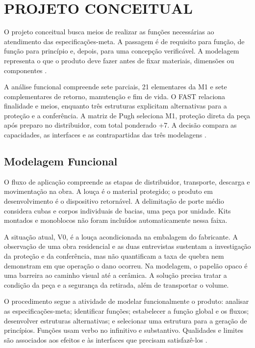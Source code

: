 \clearpage
\section{PROJETO CONCEITUAL}

O projeto conceitual busca meios de realizar as funções necessárias ao atendimento das especificações-meta. A passagem é de requisito para função, de função para princípio e, depois, para uma concepção verificável. A modelagem representa o que o produto deve fazer antes de fixar materiais, dimensões ou componentes \citep{back2008,rozenfeld2006}.

A análise funcional compreende sete parciais, 21 elementares da M1 e sete complementares de retorno, manutenção e fim de vida. O FAST relaciona finalidade e meios, enquanto três estruturas explicitam alternativas para a proteção e a conferência. A matriz de Pugh seleciona M1, proteção direta da peça após preparo no distribuidor, com total ponderado +7. A decisão compara as capacidades, as interfaces e as contrapartidas das três modelagens \citep{equipeconceitual2026,planilhapsp62026}.

\subsection{Modelagem Funcional}

O fluxo de aplicação compreende as etapas de distribuidor, transporte, descarga e movimentação na obra. A louça é o material protegido; o produto em desenvolvimento é o dispositivo retornável. A delimitação de porte médio considera cubas e corpos individuais de bacias, uma peça por unidade. Kits montados e monoblocos não foram incluídos automaticamente nessa faixa.

A situação atual, V0, é a louça acondicionada na embalagem do fabricante. A observação de uma obra residencial e as duas entrevistas sustentam a investigação da proteção e da conferência, mas não quantificam a taxa de quebra nem demonstram em que operação o dano ocorreu. Na modelagem, o papelão opaco é uma barreira ao caminho visual até a cerâmica. A solução precisa tratar a condição da peça e a segurança da retirada, além de transportar o volume.

O procedimento segue a atividade de modelar funcionalmente o produto: analisar as especificações-meta; identificar funções; estabelecer a função global e os fluxos; desenvolver estruturas alternativas; e selecionar uma estrutura para a geração de princípios. Funções usam verbo no infinitivo e substantivo. Qualidades e limites são associados aos efeitos e às interfaces que precisam satisfazê-los \citep{aulasmodelagem}.

